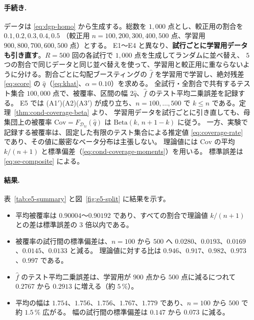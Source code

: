 \documentclass[a4paper,11pt]{jsarticle}
\theoremstyle{definition}
\theoremstyle{plain}
\theoremstyle{remark}
\newcommand{\Dtr}{\mathcal{D}_{\mathrm{tr}}}     %
\newcommand{\qhat}{\hat{q}}
\newcommand{\fhat}{\hat{f}}
\begin{document}
\paragraph{手続き.}
データは \eqref{eq:dgp-homo} から生成する。総数を $1{,}000$ 点とし、較正用の割合を $0.1,0.2,0.3,0.4,0.5$
（較正用 $n=100,200,300,400,500$ 点、学習用 $900,800,700,600,500$ 点）とする。
E1〜E4 と異なり、\textbf{試行ごとに学習用データも引き直す}。$R=500$ 回の各試行で $1{,}000$ 点を生成してランダムに並べ替え、
$5$ つの割合で同じデータと同じ並べ替えを使って、学習用と較正用に重ならないように分ける。割合ごとに勾配ブースティングの
$\fhat$ を学習用で学習し、絶対残差 \eqref{eq:score} の $\qhat$（\eqref{eq:khat}、$\alpha=0.10$）を求める。
全試行・全割合で共有するテスト集合 $100{,}000$ 点で、被覆率、区間の幅 $2\qhat$、$\fhat$ のテスト平均二乗誤差を記録する。
E5 では (A1$'$)(A2)(A3$'$) が成り立ち、$n=100,\dots,500$ で $k\le n$ である。定理~\ref{thm:cond-coverage-beta} より、
学習用データを試行ごとに引き直しても、母集団上の被覆率 $\mathrm{Cov}=F_{\Dtr}(\qhat)$ は $\mathrm{Beta}(k,\,n+1-k)$ に従う。
一方、実験で記録する被覆率は、固定した有限のテスト集合による推定値 \eqref{eq:coverage-rate} であり、その値に厳密なベータ分布は主張しない。
理論値には $\mathrm{Cov}$ の平均 $k/(n+1)$ と標準偏差（\eqref{eq:cond-coverage-moments}）を用いる。
標準誤差は \eqref{eq:se-composite} による。

\paragraph{結果.}
表~\ref{tab:e5-summary} と図~\ref{fig:e5-split} に結果を示す。
\begin{itemize}
  \item 平均被覆率は $0.90004$〜$0.90192$ であり、すべての割合で理論値 $k/(n+1)$ との差は標準誤差の $3$ 倍以内である。
  \item 被覆率の試行間の標準偏差は、$n=100$ から $500$ へ $0.0280$、$0.0193$、$0.0169$、$0.0145$、$0.0133$ と減る。
    理論値に対する比は $0.946$、$0.917$、$0.982$、$0.973$、$0.997$ である。
  \item $\fhat$ のテスト平均二乗誤差は、学習用が $900$ 点から $500$ 点に減るにつれて $0.2767$ から $0.2913$ に増える（約 $5\,\%$）。
  \item 平均の幅は $1.754$、$1.756$、$1.756$、$1.767$、$1.779$ であり、$n=100$ から $500$ で約 $1.5\,\%$ 広がる。
    幅の試行間の標準偏差は $0.147$ から $0.073$ に減る。
\end{itemize}
\end{document}
